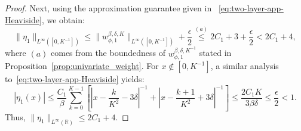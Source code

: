 \documentclass[11pt]{article}
\begin{document}
\begin{proof}
    Next, using the approximation guarantee given in ~\eqref{eq:two-layer-app-Heaviside}, we obtain:
    \begin{equation*}
        \|\eta_1\|_{L^{\infty}([0,K^{-1}])} \leq \|w_{\phi,1}^{\beta, \delta, K}\|_{L^{\infty}([0,K^{-1}])} + \frac{\epsilon}{2} \overset{(a)}{\leq } 2C_1 + 3 +\frac{\epsilon}{2} < 2C_1 +4,
    \end{equation*}
    where $(a)$ comes from the boundedness of $w_{\phi,1}^{\beta, \delta, K^{-1}}$ stated in Proposition~\ref{prop:univariate_weight}. For $x \notin [0,K^{-1}]$, a similar analysis to~\eqref{eq:two-layer-app-Heaviside} yields:
    \begin{equation*}
        |\eta_1(x)| \leq \frac{C_1}{\beta}\sum_{k=0}^{K-1} \left[\left| x - \frac{k}{K^2} - 3 \delta \right|^{-1} + \left| x - \frac{k+1}{K^2} + 3 \delta\right|^{-1}\right] \leq \frac{2C_1 K}{3 \beta \delta} \leq \frac{\epsilon}{2} < 1.
    \end{equation*}
    Thus, $\|\eta_1\|_{L^{\infty}(\mathbb{R})} \leq 2C_1 + 4$.



\end{proof}
\end{document}
